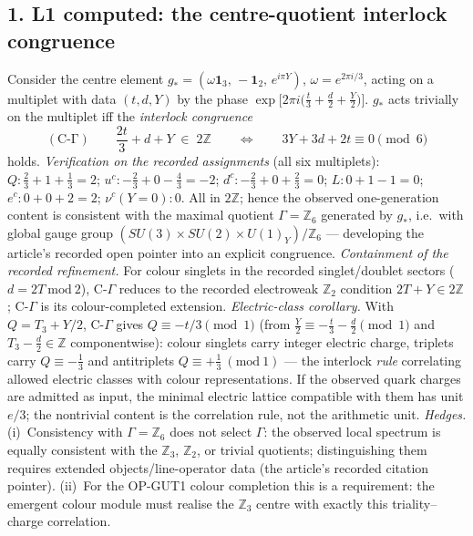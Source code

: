 \subsection*{1. L1 computed: the centre-quotient interlock
congruence}
Consider the centre element
$g_*=(\omega\mathbf 1_3,\,-\mathbf 1_2,\,e^{i\pi Y})$,
$\omega=e^{2\pi i/3}$, acting on a multiplet with data $(t,d,Y)$
by the phase $\exp\!\bigl[2\pi i\bigl(\tfrac t3+\tfrac d2
+\tfrac Y2\bigr)\bigr]$.
$g_*$ acts trivially on the multiplet iff the
\emph{interlock congruence}
\[
\mathrm{(C\mbox{-}\Gamma)}\qquad
\frac{2t}{3}+d+Y\;\in\;2\mathbb Z
\qquad\Longleftrightarrow\qquad
3Y+3d+2t\equiv0 \pmod 6
\]
holds.
\emph{Verification on the recorded assignments} (all six
multiplets): $Q:\tfrac23+1+\tfrac13=2$;
$u^c:-\tfrac23+0-\tfrac43=-2$; $d^c:-\tfrac23+0+\tfrac23=0$;
$L:0+1-1=0$; $e^c:0+0+2=2$; $\nu^c(Y=0):0$.
All in $2\mathbb Z$; hence the observed one-generation content is
consistent with the maximal quotient $\Gamma=\mathbb Z_6$
generated by $g_*$, i.e.\ with global gauge group
$(SU(3)\times SU(2)\times U(1)_Y)/\mathbb Z_6$ --- developing the
article's recorded open pointer into an explicit congruence.
\emph{Containment of the recorded refinement.}
For colour singlets in the recorded singlet/doublet sectors
($d=2T\ \mathrm{mod}\ 2$), C-$\Gamma$ reduces to the recorded
electroweak $\mathbb Z_2$ condition $2T+Y\in2\mathbb Z$;
C-$\Gamma$ is its colour-completed extension.
\emph{Electric-class corollary.}
With $Q=T_3+Y/2$, C-$\Gamma$ gives $Q\equiv-t/3\pmod 1$
(from $\tfrac Y2\equiv-\tfrac t3-\tfrac d2\pmod 1$ and
$T_3-\tfrac d2\in\mathbb Z$ componentwise): colour
singlets carry integer electric charge, triplets carry
$Q\equiv-\tfrac13$ and antitriplets
$Q\equiv+\tfrac13\ (\mathrm{mod}\ 1)$ --- the
interlock \emph{rule} correlating allowed electric classes with
colour representations.
If the observed quark charges are admitted as input, the minimal
electric lattice compatible with them has unit $e/3$; the
nontrivial content is the correlation rule, not the arithmetic
unit.
\emph{Hedges.}
(i)~Consistency with $\Gamma=\mathbb Z_6$ does not select
$\Gamma$: the observed local spectrum is equally consistent with
the $\mathbb Z_3$, $\mathbb Z_2$, or trivial quotients;
distinguishing them requires extended objects/line-operator data
(the article's recorded citation pointer).
(ii)~For the OP-GUT1 colour completion this is a requirement: the
emergent colour module must realise the $\mathbb Z_3$ centre with
exactly this triality--charge correlation.


